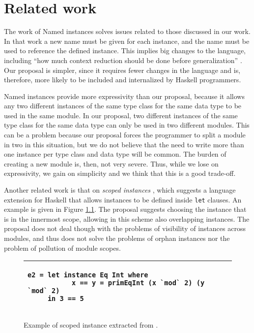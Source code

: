 \documentclass[msc]{ppgccufmg}
\begin{document}
\chapter{Related work}
\label{related}
The work of Named instances \citep{named} solves issues related to those
discussed in our work.  In that work a new name must be given for each instance,
and the name must be used to reference the defined instance.  This implies big changes to the
language, including ``how much context reduction should be done before
generalization'' \citep[p.~8]{tc}.  Our proposal is simpler, since it requires fewer
changes in the language and is, therefore, more likely to be included and
internalized by Haskell programmers.

Named instances provide more expressivity than our proposal, because it allows
any two different instances of the same type class for the same data type to be
used in the same module.  In our proposal, two different instances of the same
type class for the same data type can only be used in two different modules.
This can be a problem because our proposal forces the programmer to split a
module in two in this situation, but we do not believe that the need to
write more than one instance per type class and data type will be common. The
burden of creating a new module is, then, not very severe.  Thus, while we lose on expressivity,
we gain on simplicity and we think that this is a good trade-off.

Another related work is that on \emph{scoped instances} \citep{scoped}, which
suggests a language extension for Haskell that allows instances to be
defined inside \texttt{let} clauses. An example is given in Figure \ref{scoped}. The
proposal suggests choosing the instance that is in the innermost scope,
allowing in this scheme also overlapping instances. The proposal does not
deal though with the problems of visibility of instances across modules, and
thus does not solve the problems of orphan instances nor the problem of
pollution of module scopes.

\begin{figure}
\caption{Example of scoped instance extracted from \citep[section~6]{scoped}.\label{scoped}}
\begin{tabular}{|p{\textwidth}|}
\hline
\begin{verbatim}
e2 = let instance Eq Int where
           x == y = primEqInt (x `mod` 2) (y `mod` 2)
     in 3 == 5
\end{verbatim}
\\
\hline
\end{tabular}
\end{figure}
\end{document}
